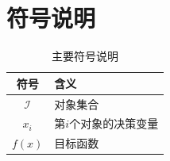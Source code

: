 \section{符号说明}

\begin{table}[H]
\centering
\caption{主要符号说明}
\begin{tabular}{cl}
\toprule
符号 & 含义 \\
\midrule
$\mathcal{I}$ & 对象集合 \\
$x_i$ & 第$i$个对象的决策变量 \\
$f(x)$ & 目标函数 \\
\bottomrule
\end{tabular}
\end{table}

